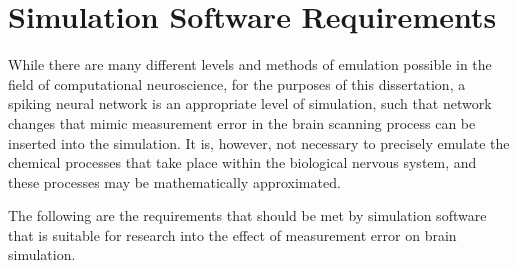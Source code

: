 \section{Simulation Software Requirements}
\label{SimulationRequirements}

While there are many different levels and methods of emulation possible in the
field of computational neuroscience, for the purposes of this dissertation, a
spiking neural network is an appropriate level of simulation, such that network
changes that mimic measurement error in the brain scanning process can be
inserted into the simulation. It is, however, not necessary to precisely emulate
the chemical processes that take place within the biological nervous system, and
these processes may be mathematically approximated.

The following are the requirements that should be met by simulation software
that is suitable for research into the effect of measurement error on brain
simulation.

